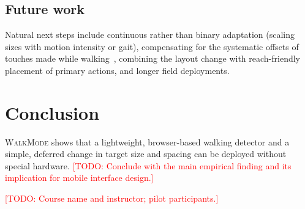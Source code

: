 \documentclass[sigconf,nonacm]{acmart}
\newcommand{\todo}[1]{\textcolor{red}{[TODO: #1]}}
\newcommand{\WM}{\textsc{WalkMode}}
\begin{document}
\subsection{Future work}
Natural next steps include continuous rather than binary adaptation (scaling sizes with motion intensity or gait), compensating for the systematic offsets of touches made while walking~\cite{goel2012walktype,music2016nomadic}, combining the layout change with reach-friendly placement of primary actions, and longer field deployments.

\section{Conclusion}
\WM{} shows that a lightweight, browser-based walking detector and a simple, deferred change in target size and spacing can be deployed without special hardware. \todo{Conclude with the main empirical finding and its implication for mobile interface design.}

\begin{acks}
\todo{Course name and instructor; pilot participants.}
\end{acks}



\end{document}
